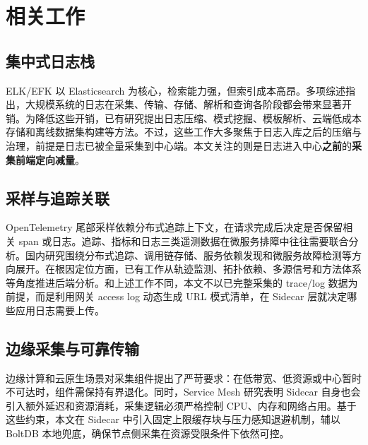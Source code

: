 \section{相关工作}

\subsection{集中式日志栈}
ELK/EFK 以 Elasticsearch 为核心，检索能力强，但索引成本高昂。多项综述指出，大规模系统的日志在采集、传输、存储、解析和查询各阶段都会带来显著开销\cite{liao2016logs,limingshu2019logmgmt,he2020logsurvey,chen2020loganomaly}。为降低这些开销，已有研究提出日志压缩、模式挖掘、模板解析、云端低成本存储和离线数据集构建等方法\cite{liu2019logzip,zhu2020loghub,wei2023cloudlogstorage,khan2022logtemplate}。不过，这些工作大多聚焦于日志入库之后的压缩与治理，前提是日志已被全量采集到中心端。本文关注的则是日志进入中心\textbf{之前}的\textbf{采集前端定向减量}。

\subsection{采样与追踪关联}
OpenTelemetry 尾部采样依赖分布式追踪上下文，在请求完成后决定是否保留相关 span 或日志\cite{otel_tail}。追踪、指标和日志三类遥测数据在微服务排障中往往需要联合分析\cite{usman2022observability,maruf2022telemetry,moreschini2023microai}。国内研究围绕分布式追踪、调用链存储、服务依赖发现和微服务故障检测等方向展开\cite{yang2020tracingsurvey,huang2023javatrace,you2021tracelogstorage,yuqingyang2022trace,zhang2024servicedep,wanglu2023microfault}。在根因定位方面，已有工作从轨迹监测、拓扑依赖、多源信号和方法体系等角度推进后端分析\cite{wang2017tracefault,wu2020microrca,zhang2023multimodal,wang2024rca}。和上述工作不同，本文不以已完整采集的 trace/log 数据为前提，而是利用网关 access log 动态生成 URL 模式清单，在 Sidecar 层就决定哪些应用日志需要上传。

\subsection{边缘采集与可靠传输}
边缘计算和云原生场景对采集组件提出了严苛要求：在低带宽、低资源或中心暂时不可达时，组件需保持有界退化\cite{varghese2022edge,usman2022observability,liu2017microcontainer}。同时，Service Mesh 研究表明 Sidecar 自身也会引入额外延迟和资源消耗\cite{zhu2023sidecar,soldani2023ebpf}，采集逻辑必须严格控制 CPU、内存和网络占用。基于这些约束，本文在 Sidecar 中引入固定上限缓存块与压力感知退避机制，辅以 BoltDB 本地兜底，确保节点侧采集在资源受限条件下依然可控。

